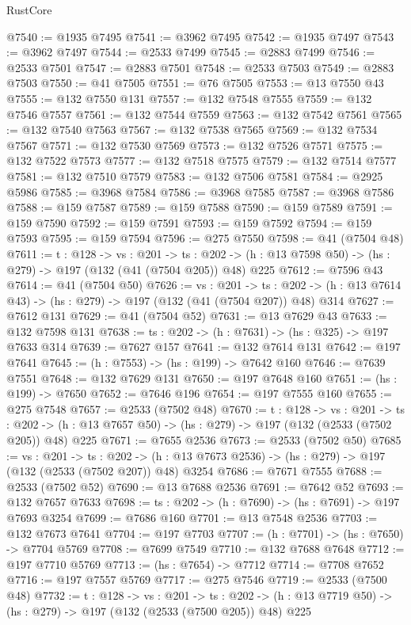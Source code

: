 \begin{lexlean}{RustCore}
\begin{coremodule}
@7540 := @1935 @7495
@7541 := @3962 @7495
@7542 := @1935 @7497
@7543 := @3962 @7497
@7544 := @2533 @7499
@7545 := @2883 @7499
@7546 := @2533 @7501
@7547 := @2883 @7501
@7548 := @2533 @7503
@7549 := @2883 @7503
@7550 := @41 @7505
@7551 := @76 @7505
@7553 := @13 @7550 @43
@7555 := @132 @7550 @131
@7557 := @132 @7548 @7555
@7559 := @132 @7546 @7557
@7561 := @132 @7544 @7559
@7563 := @132 @7542 @7561
@7565 := @132 @7540 @7563
@7567 := @132 @7538 @7565
@7569 := @132 @7534 @7567
@7571 := @132 @7530 @7569
@7573 := @132 @7526 @7571
@7575 := @132 @7522 @7573
@7577 := @132 @7518 @7575
@7579 := @132 @7514 @7577
@7581 := @132 @7510 @7579
@7583 := @132 @7506 @7581
@7584 := @2925 @5986
@7585 := @3968 @7584
@7586 := @3968 @7585
@7587 := @3968 @7586
@7588 := @159 @7587
@7589 := @159 @7588
@7590 := @159 @7589
@7591 := @159 @7590
@7592 := @159 @7591
@7593 := @159 @7592
@7594 := @159 @7593
@7595 := @159 @7594
@7596 := @275 @7550
@7598 := @41 (@7504 @48)
@7611 := {t : @128} ->
  {vs : @201} ->
  {ts : @202} -> (h : @13 @7598 @50) -> (hs : @279) -> @197 (@132 (@41 (@7504 @205)) @48) @225
@7612 := @7596 @43
@7614 := @41 (@7504 @50)
@7626 := {vs : @201} ->
  {ts : @202} -> (h : @13 @7614 @43) -> (hs : @279) -> @197 (@132 (@41 (@7504 @207)) @48) @314
@7627 := @7612 @131
@7629 := @41 (@7504 @52)
@7631 := @13 @7629 @43
@7633 := @132 @7598 @131
@7638 := {ts : @202} -> (h : @7631) -> (hs : @325) -> @197 @7633 @314
@7639 := @7627 @157
@7641 := @132 @7614 @131
@7642 := @197 @7641
@7645 := (h : @7553) -> (hs : @199) -> @7642 @160
@7646 := @7639 @7551
@7648 := @132 @7629 @131
@7650 := @197 @7648 @160
@7651 := (hs : @199) -> @7650
@7652 := @7646 @196
@7654 := @197 @7555 @160
@7655 := @275 @7548
@7657 := @2533 (@7502 @48)
@7670 := {t : @128} ->
  {vs : @201} ->
  {ts : @202} -> (h : @13 @7657 @50) -> (hs : @279) -> @197 (@132 (@2533 (@7502 @205)) @48) @225
@7671 := @7655 @2536
@7673 := @2533 (@7502 @50)
@7685 := {vs : @201} ->
  {ts : @202} -> (h : @13 @7673 @2536) -> (hs : @279) -> @197 (@132 (@2533 (@7502 @207)) @48) @3254
@7686 := @7671 @7555
@7688 := @2533 (@7502 @52)
@7690 := @13 @7688 @2536
@7691 := @7642 @52
@7693 := @132 @7657 @7633
@7698 := {ts : @202} -> (h : @7690) -> (hs : @7691) -> @197 @7693 @3254
@7699 := @7686 @160
@7701 := @13 @7548 @2536
@7703 := @132 @7673 @7641
@7704 := @197 @7703
@7707 := (h : @7701) -> (hs : @7650) -> @7704 @5769
@7708 := @7699 @7549
@7710 := @132 @7688 @7648
@7712 := @197 @7710 @5769
@7713 := (hs : @7654) -> @7712
@7714 := @7708 @7652
@7716 := @197 @7557 @5769
@7717 := @275 @7546
@7719 := @2533 (@7500 @48)
@7732 := {t : @128} ->
  {vs : @201} ->
  {ts : @202} -> (h : @13 @7719 @50) -> (hs : @279) -> @197 (@132 (@2533 (@7500 @205)) @48) @225

\end{coremodule}
\end{lexlean}
